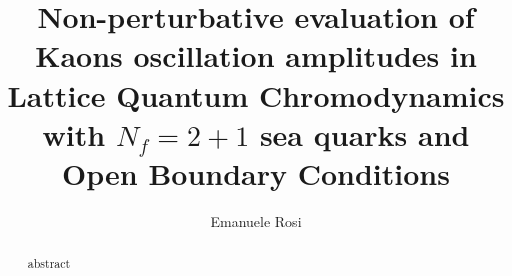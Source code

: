 \documentclass[english, LaM, oneside, noexaminfo]{sapthesis}
\title{Non-perturbative evaluation of Kaons oscillation amplitudes in Lattice Quantum Chromodynamics with $N_f = 2+1$ sea quarks and Open Boundary Conditions}
\author{Emanuele Rosi}
\begin{document}
\frontmatter
\maketitle

\dedication{
    dedication - da scegliere
    \textcolor{white}
    {   
        \newline
        Idee varie:
        \newline\newline
        (1) Lord Byron: 'There is a pleasure in the pathless woods,\newline
        There is a rapture on the lonely shore,\newline
        There is society, where none intrudes,\newline
        By the deep Sea, and music in its roar'\newline
        \newline\newline
        (2) Trainspotting:
        Scegliete la vita; scegliete un lavoro; scegliete una carriera;\newline
        scegliete la famiglia; scegliete un maxitelevisore del cazzo;\newline
        scegliete lavatrici, macchine, lettori CD e apriscatole elettrici.\newline
        Ma scegliete
        \newline\newline
        (3) Shujaat / shajaeatan / scritta in arabo
        \newline\newline
        Dedico questa tesi a tutti quelli che:\newline
         ``Fisica, che coraggio! E dopo che vuoi fare? Ma questa cosa a che serve?\newline
         Il prof al liceo alla fine ha tre mesi di vacanza no? Il ricercatore.. spero tu voglia farlo all'estero, mica qui in Italia!\newline
         Io di questa roba non capisco nulla, per fortuna che ci state voi.''
    }
}

\begin{abstract}
    abstract
\end{abstract}

\tableofcontents

\mainmatter

\end{document}

